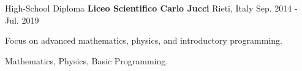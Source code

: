 \begin{cventries}
  \vspace{0.3cm} %

  \cventry
    {High-School Diploma} %
    {\textbf{Liceo Scientifico Carlo Jucci}} %
    {Rieti, Italy} %
    {Sep. 2014 - Jul. 2019} %
    {
      \begin{cvitems} %
        \item {Focus on advanced mathematics, physics, and introductory programming.}
        \item {Mathematics, Physics, Basic Programming.}
      \end{cvitems}
    }
\end{cventries}